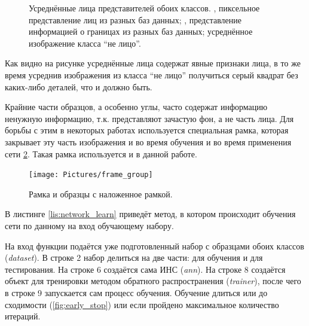 \documentclass[12pt]{report}
\begin{document}
\begin{figure}[h]
	\centering
	\caption{Усреднённые лица представителей обоих классов. ,  
пиксельное представление лиц из разных баз данных; ,  
представление информацией о границах из разных баз данных;  усреднённое изображение класса 
``не лицо''.}
	\label{fig:avg_faces}
\end{figure}
Как видно на рисунке усреднённые лица содержат явные признаки лица, в то же время усреднив изображения из класса 
``не 
лицо'' получиться серый квадрат без каких-либо деталей, что и должно быть.

Крайние части образцов, а особенно углы, часто содержат информацию ненужную информацию, т.к. представляют зачастую 
фон, а не часть лица. Для борьбы с этим в некоторых работах используется специальная рамка, которая закрывает эту 
часть изображения и во время обучения и во время применения сети \ref{fig:frame}. Такая рамка используется и в 
данной 
работе.

\begin{figure}[h]
	\centering
	\texttt{[image: Pictures/frame\_group]}
	\caption{Рамка и образцы с наложенное рамкой.}
	\label{fig:frame}
\end{figure}

В листинге \ref{lis:network_learn} приведёт метод, в котором происходит обучения сети по данному на вход обучающему 
набору.
\lstset{caption=Обучение сети на основе данного обучающего набора.,
label=lis:network_learn,
basicstyle=\footnotesize\ttfamily,
captionpos=b,
breaklines=true,
breakatwhitespace=false,
numbers=left,
numbersep=5pt,
language=Python,
}


На вход функции подаётся уже подготовленный набор с образцами обоих классов (\textit{dataset}). В строке 2 набор 
делиться на две части: для обучения и для тестирования. На строке 6 создаётся сама ИНС (\textit{ann}). На строке 8 
создаётся объект для тренировки методом обратного распространения (\textit{trainer}), после чего в строке 9 
запускается сам процесс обучения. Обучение длиться или до сходимости (\ref{fig:early_stop}) или если пройдено 
максимальное количество итераций.
\end{document}
